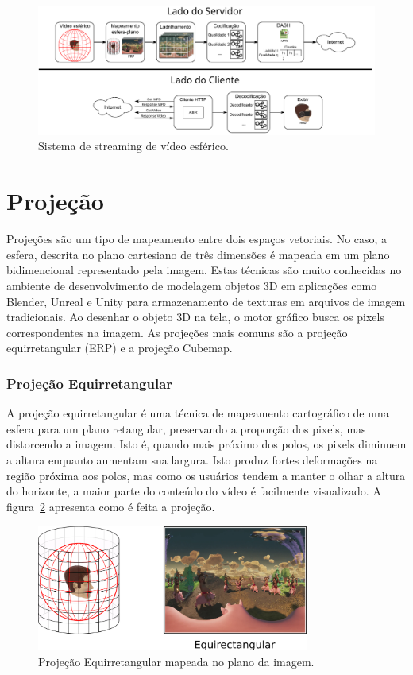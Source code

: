 \begin{figure}
	\centering
	\includegraphics[width=0.9\linewidth]{"fig/Streaming - client-side and server-side.pdf"}
	\caption{Sistema de streaming de vídeo esférico.}
	\label{fig:streaming---client-side-and-server-side}
\end{figure}


\section{Projeção}

Projeções são um tipo de mapeamento entre dois espaços vetoriais. No caso, a esfera, descrita no plano cartesiano de três dimensões é mapeada em um plano bidimencional representado pela imagem. Estas técnicas são muito conhecidas no ambiente de desenvolvimento de modelagem objetos 3D em aplicações como Blender, Unreal e Unity para armazenamento de texturas em arquivos de imagem tradicionais. Ao desenhar o objeto 3D na tela, o motor gráfico busca os pixels correspondentes na imagem. As projeções mais comuns são a projeção equirretangular (ERP) e a projeção Cubemap. 

\subsubsection{Projeção Equirretangular}

A projeção equirretangular é uma técnica de mapeamento cartográfico de uma esfera para um plano retangular, preservando a proporção dos pixels, mas distorcendo a imagem. Isto é, quando mais próximo dos polos, os pixels diminuem a altura enquanto aumentam sua largura. Isto produz fortes deformações na região próxima aos polos, mas como os usuários tendem a manter o olhar a altura do horizonte, a maior parte do conteúdo do vídeo é facilmente visualizado. A figura~\ref{fig:erp} apresenta como é feita a projeção.

\begin{figure}
	\centering
	\includegraphics[width=0.8\textwidth]{fig/erp.png}
	\caption{Projeção Equirretangular mapeada no plano da imagem.}
	\label{fig:erp}
\end{figure}

